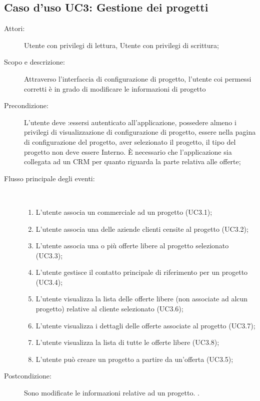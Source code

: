 \documentclass[12pt,a4paper,twoside,openright,english]{book}
\begin{document}
\subsection{Caso d'uso UC3: Gestione dei progetti}\begin{description}
	\item[Attori:] Utente con privilegi di lettura, Utente con privilegi di scrittura;
	\item[Scopo e descrizione:] Attraverso l’interfaccia di configurazione di progetto, l’utente coi permessi corretti è in grado di modificare le informazioni di progetto 
	\item[Precondizione:] L’utente deve :essersi autenticato all’applicazione, possedere almeno i privilegi di visualizzazione di configurazione di progetto, essere nella pagina di configurazione del progetto, aver selezionato il progetto, il tipo del progetto non deve essere Interno.
	È necessario che l’applicazione sia collegata ad un CRM per quanto riguarda la parte relativa alle offerte;
	
	\item[Flusso principale degli eventi:] \ 
	\begin{enumerate}
		\item L’utente associa un commerciale ad un progetto  (UC3.1);
		\item L’utente associa una delle aziende clienti censite al progetto  (UC3.2);
		\item L’utente associa una o più offerte libere al progetto selezionato  (UC3.3);
		\item L’utente gestisce il contatto principale di riferimento per un progetto  (UC3.4);
		\item L’utente visualizza la lista delle offerte libere (non associate ad alcun progetto) relative al cliente selezionato  (UC3.6);
		\item L’utente visualizza i dettagli delle offerte associate al progetto  (UC3.7);
		\item L’utente visualizza la lista di tutte le offerte libere  (UC3.8);
		\item L’utente può creare un progetto a partire da un’offerta  (UC3.5);
		
	\end{enumerate}
	\item[Postcondizione:] Sono modificate le informazioni relative ad un progetto. .
\end{description}

\hypertarget{UC3.4}{}
\end{document}
